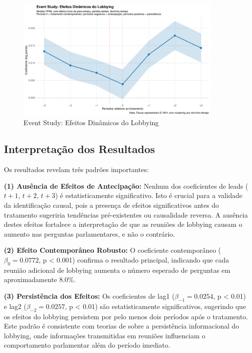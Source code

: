 \begin{figure}[htbp]
    \centering
    \includegraphics[width=0.9\textwidth]{figures/leads_lags/event_study_leads_lags.pdf}
    \caption{Event Study: Efeitos Dinâmicos do Lobbying}
    \label{fig:event_study_leads_lags}
\end{figure}

\subsection{Interpretação dos Resultados}

Os resultados revelam três padrões importantes:

\textbf{(1) Ausência de Efeitos de Antecipação:} Nenhum dos coeficientes de leads ($t+1$, $t+2$, $t+3$) é estatisticamente significativo. Isto é crucial para a validade da identificação causal, pois a presença de efeitos significativos antes do tratamento sugeriria tendências pré-existentes ou causalidade reversa. A ausência destes efeitos fortalece a interpretação de que as reuniões de lobbying causam o aumento nas perguntas parlamentares, e não o contrário.

\textbf{(2) Efeito Contemporâneo Robusto:} O coeficiente contemporâneo ($\beta_0 = 0.0772$, p < 0.001) confirma o resultado principal, indicando que cada reunião adicional de lobbying aumenta o número esperado de perguntas em aproximadamente 8.0\%.

\textbf{(3) Persistência dos Efeitos:} Os coeficientes de lag1 ($\beta_{-1} = 0.0254$, p < 0.01) e lag2 ($\beta_{-2} = 0.0257$, p < 0.01) são estatisticamente significativos, sugerindo que os efeitos do lobbying persistem por pelo menos dois períodos após o tratamento. Este padrão é consistente com teorias de \cite{baumgartner2009lobbying} sobre a persistência informacional do lobbying, onde informações transmitidas em reuniões influenciam o comportamento parlamentar além do período imediato.

